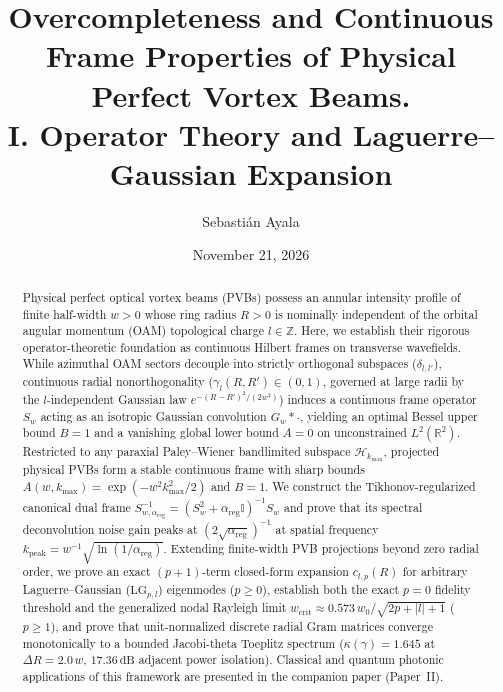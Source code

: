 \documentclass[aps,pra,onecolumn,notitlepage,11pt,tightenlines,nofootinbib,floatfix,longbibliography]{revtex4-2}
\theoremstyle{remark}
\newcommand{\abs}[1]{\lvert #1 \rvert}
\begin{document}
\title{Overcompleteness and Continuous Frame Properties of Physical Perfect Vortex Beams.\\I. Operator Theory and Laguerre--Gaussian Expansion}

\author{Sebasti\'an Ayala}

\date{November 21, 2026}

\begin{abstract}
Physical perfect optical vortex beams (PVBs) possess an annular intensity profile of finite half-width $w > 0$ whose ring radius $R > 0$ is nominally independent of the orbital angular momentum (OAM) topological charge $l \in \mathbb{Z}$. Here, we establish their rigorous operator-theoretic foundation as continuous Hilbert frames on transverse wavefields. While azimuthal OAM sectors decouple into strictly orthogonal subspaces ($\delta_{l,l'}$), continuous radial nonorthogonality ($\gamma_l(R,R') \in (0,1)$, governed at large radii by the $l$-independent Gaussian law $e^{-(R-R')^2/(2w^2)}$) induces a continuous frame operator $S_w$ acting as an isotropic Gaussian convolution $G_w * \cdot$, yielding an optimal Bessel upper bound $B = 1$ and a vanishing global lower bound $A = 0$ on unconstrained $L^2(\mathbb{R}^2)$. Restricted to any paraxial Paley--Wiener bandlimited subspace $\mathcal{H}_{k_{\max}}$, projected physical PVBs form a stable continuous frame with sharp bounds $A(w,k_{\max}) = \exp(-w^2 k_{\max}^2/2)$ and $B = 1$. We construct the Tikhonov-regularized canonical dual frame $S_{w,\alpha_{\mathrm{reg}}}^{-1} = (S_w^2 + \alpha_{\mathrm{reg}}\mathbb{I})^{-1}S_w$ and prove that its spectral deconvolution noise gain peaks at $(2\sqrt{\alpha_{\mathrm{reg}}})^{-1}$ at spatial frequency $k_{\mathrm{peak}} = w^{-1}\sqrt{\ln(1/\alpha_{\mathrm{reg}})}$. Extending finite-width PVB projections beyond zero radial order, we prove an exact $(p+1)$-term closed-form expansion $c_{l,p}(R)$ for arbitrary Laguerre--Gaussian ($\mathrm{LG}_{p,l}$) eigenmodes ($p \ge 0$), establish both the exact $p = 0$ fidelity threshold and the generalized nodal Rayleigh limit $w_{\mathrm{crit}} \approx 0.573\,w_0/\sqrt{2p+\abs{l}+1}$ ($p \ge 1$), and prove that unit-normalized discrete radial Gram matrices converge monotonically to a bounded Jacobi-theta Toeplitz spectrum ($\kappa(\gamma) = 1.645$ at $\Delta R = 2.0\,w$, $17.36\,\mathrm{dB}$ adjacent power isolation). Classical and quantum photonic applications of this framework are presented in the companion paper (Paper~II).
\end{abstract}
\end{document}
